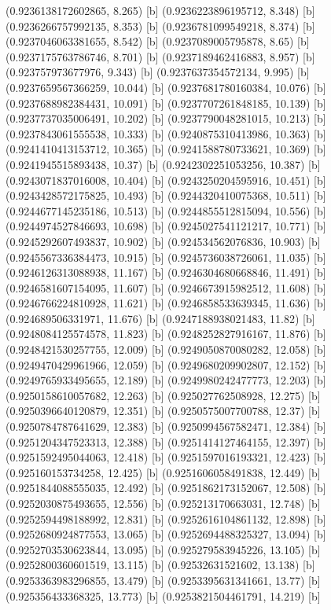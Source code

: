 {{{(0.9236138172602865, 8.265) [b] 
(0.9236223896195712, 8.348) [b] 
(0.9236266757992135, 8.353) [b] 
(0.9236781099549218, 8.374) [b] 
(0.9237046063381655, 8.542) [b] 
(0.9237089005795878, 8.65) [b] 
(0.9237175763786746, 8.701) [b] 
(0.9237189462416883, 8.957) [b] 
(0.923757973677976, 9.343) [b] 
(0.9237637354572134, 9.995) [b] 
(0.9237659567366259, 10.044) [b] 
(0.9237681780160384, 10.076) [b] 
(0.9237688982384431, 10.091) [b] 
(0.9237707261848185, 10.139) [b] 
(0.9237737035006491, 10.202) [b] 
(0.9237790048281015, 10.213) [b] 
(0.9237843061555538, 10.333) [b] 
(0.9240875310413986, 10.363) [b] 
(0.9241410413153712, 10.365) [b] 
(0.9241588780733621, 10.369) [b] 
(0.9241945515893438, 10.37) [b] 
(0.9242302251053256, 10.387) [b] 
(0.9243071837016008, 10.404) [b] 
(0.9243250204595916, 10.451) [b] 
(0.9243428572175825, 10.493) [b] 
(0.9244320410075368, 10.511) [b] 
(0.9244677145235186, 10.513) [b] 
(0.9244855512815094, 10.556) [b] 
(0.9244974527846693, 10.698) [b] 
(0.9245027541121217, 10.771) [b] 
(0.9245292607493837, 10.902) [b] 
(0.924534562076836, 10.903) [b] 
(0.9245567336384473, 10.915) [b] 
(0.9245736038726061, 11.035) [b] 
(0.9246126313088938, 11.167) [b] 
(0.9246304680668846, 11.491) [b] 
(0.9246581607154095, 11.607) [b] 
(0.9246673915982512, 11.608) [b] 
(0.9246766224810928, 11.621) [b] 
(0.9246858533639345, 11.636) [b] 
(0.924689506331971, 11.676) [b] 
(0.9247188938021483, 11.82) [b] 
(0.9248084125574578, 11.823) [b] 
(0.9248252827916167, 11.876) [b] 
(0.9248421530257755, 12.009) [b] 
(0.9249050870080282, 12.058) [b] 
(0.9249470429961966, 12.059) [b] 
(0.9249680209902807, 12.152) [b] 
(0.9249765933495655, 12.189) [b] 
(0.9249980242477773, 12.203) [b] 
(0.9250158610057682, 12.263) [b] 
(0.925027762508928, 12.275) [b] 
(0.9250396640120879, 12.351) [b] 
(0.9250575007700788, 12.37) [b] 
(0.9250784787641629, 12.383) [b] 
(0.9250994567582471, 12.384) [b] 
(0.9251204347523313, 12.388) [b] 
(0.9251414127464155, 12.397) [b] 
(0.9251592495044063, 12.418) [b] 
(0.9251597016193321, 12.423) [b] 
(0.925160153734258, 12.425) [b] 
(0.9251606058491838, 12.449) [b] 
(0.9251844088555035, 12.492) [b] 
(0.9251862173152067, 12.508) [b] 
(0.9252030875493655, 12.556) [b] 
(0.925213170663031, 12.748) [b] 
(0.9252594498188992, 12.831) [b] 
(0.9252616104861132, 12.898) [b] 
(0.9252680924877553, 13.065) [b] 
(0.9252694488325327, 13.094) [b] 
(0.9252703530623844, 13.095) [b] 
(0.925279583945226, 13.105) [b] 
(0.9252800360601519, 13.115) [b] 
(0.92532631521602, 13.138) [b] 
(0.9253363983296855, 13.479) [b] 
(0.9253395631341661, 13.77) [b] 
(0.925356433368325, 13.773) [b] 
(0.9253821504461791, 14.219) [b] 
}}}
